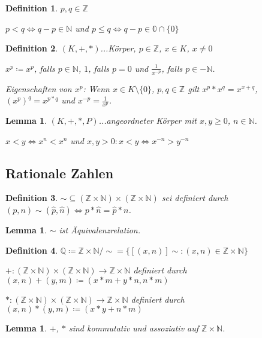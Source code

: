 \documentclass[twocolumn]{article}
\newtheorem{lemma}[theorem]{Lemma}
\newtheorem{definition}{Definition}[section]
\newcommand*{\logeq}{\Leftrightarrow}
\begin{document}
\begin{definition}
	$p,q \in \mathbb{Z}$
	
	$p < q \logeq q - p \in \mathbb{N}$ und $p \leq q \logeq q-p \in \mathbb{0} \cap \{0\}$
\end{definition}

\begin{definition}
	$(K,+,*)$...Körper, $p \in \mathbb{Z}$, $x \in K$, $x \neq 0$
	
	$x^{p} \coloneqq x^{p}$, falls $p \in \mathbb{N}$, $1$, falls $p = 0$ und $\frac{1}{x^{-p}}$, falls $p \in -\mathbb{N}$.
	
	Eigenschaften von $x^{p}$: Wenn $x \in K \setminus \{0\}$, $p,q \in \mathbb{Z}$ gilt $x^{p}*x^{q}=x^{x+q}$, $(x^{p})^{q}=x^{p*q}$ und $x^{-p}=\frac{1}{x^{p}}$.
\end{definition}

\begin{lemma}
	$(K,+,*,P)$...angeordneter Körper mit $x,y\geq 0$, $n \in \mathbb{N}$.
	
	$x<y \logeq x^{n} < x^{n}$ und $x,y>0: x<y \logeq x^{-n} > y^{-n}$
\end{lemma}

\subsection{Rationale Zahlen}
\begin{definition}
	$\sim \subseteq (\mathbb{Z}\times\mathbb{N})\times(\mathbb{Z}\times\mathbb{N})$ sei definiert durch $(p,n)\sim (\hat{p},\hat{n}) \logeq p*\hat{n}=\hat{p}*n$.
\end{definition}

\begin{lemma}
	$\sim$ ist Äquivalenzrelation.
\end{lemma}

\begin{definition}
	$\mathbb{Q}\coloneqq \mathbb{Z}\times \mathbb{N} / \sim = \{[(x,n)]\sim : (x,n) \in \mathbb{Z}\times\mathbb{N}\}$
	
	$+: (\mathbb{Z}\times\mathbb{N})\times(\mathbb{Z}\times\mathbb{N}) \rightarrow \mathbb{Z}\times\mathbb{N}$ definiert durch $(x,n)+(y,m)\coloneqq(x*m+y*n,n*m)$
	
	$*: (\mathbb{Z}\times\mathbb{N})\times(\mathbb{Z}\times\mathbb{N}) \rightarrow \mathbb{Z}\times\mathbb{N}$ definiert durch $(x,n)*(y,m)\coloneqq(x*y+n*m)$
\end{definition}

\begin{lemma}
	$+$, $*$ sind kommutativ und assoziativ auf $\mathbb{Z}\times\mathbb{N}$.
\end{lemma}
\end{document}
